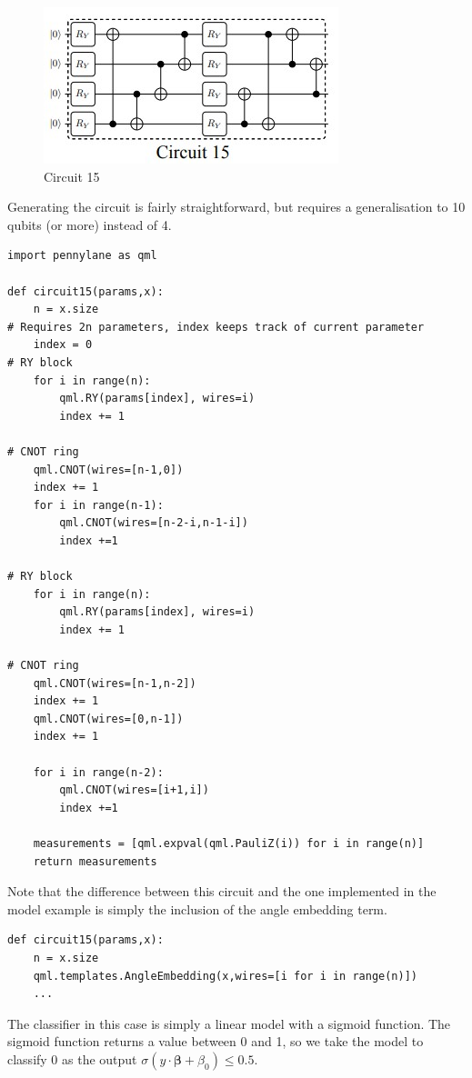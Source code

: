 \documentclass{article}
\theoremstyle{definition}
\begin{document}
\begin{figure}[htb]
    \centering
    \includegraphics{Circuit15.jpg}
    \caption{Circuit 15 \cite{Sim_2019}}
    \label{fig:circuit15}
\end{figure}
Generating the circuit is fairly straightforward, but requires a generalisation to 10 qubits (or more) instead of 4.

\begin{verbatim}
import pennylane as qml

def circuit15(params,x):
    n = x.size
# Requires 2n parameters, index keeps track of current parameter
    index = 0
# RY block
    for i in range(n):
        qml.RY(params[index], wires=i)
        index += 1

# CNOT ring
    qml.CNOT(wires=[n-1,0])
    index += 1
    for i in range(n-1):
        qml.CNOT(wires=[n-2-i,n-1-i])
        index +=1        

# RY block
    for i in range(n):
        qml.RY(params[index], wires=i)
        index += 1
        
# CNOT ring
    qml.CNOT(wires=[n-1,n-2])
    index += 1
    qml.CNOT(wires=[0,n-1])
    index += 1
    
    for i in range(n-2):
        qml.CNOT(wires=[i+1,i])
        index +=1
    
    measurements = [qml.expval(qml.PauliZ(i)) for i in range(n)]
    return measurements
\end{verbatim}
Note that the difference between this circuit and the one implemented in the model example is simply the inclusion of the angle embedding term. 
\begin{verbatim}
def circuit15(params,x):
    n = x.size
    qml.templates.AngleEmbedding(x,wires=[i for i in range(n)]) 
    ...
\end{verbatim}
The classifier in this case is simply a linear model with a sigmoid function. The sigmoid function returns a value between 0 and 1, so we take the model to classify 0 as the output $\sigma(y \cdot \bm{\beta}  + \beta_0 ) \le 0.5$.
\end{document}
